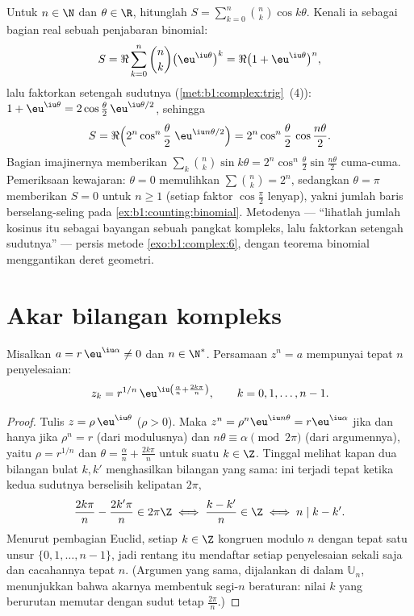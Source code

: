 \begin{example}\label{ex:b1:complex:binomsum}
Untuk $n \in \N$ dan $\theta \in \R$, hitunglah $S =
\sum_{k=0}^{n}\binom nk \cos k\theta$. Kenali ia sebagai bagian real
sebuah penjabaran binomial:
\[
S = \Re\sum_{k=0}^n \binom nk \bigl(\eu^{\iu\theta}\bigr)^k
= \Re\bigl(1 + \eu^{\iu\theta}\bigr)^n ,
\]
lalu faktorkan setengah sudutnya (\cref{met:b1:complex:trig}~(4)): $1 +
\eu^{\iu\theta} = 2\cos\frac\theta2\,\eu^{\iu\theta/2}$, sehingga
\[
S = \Re\Bigl(2^n\cos^n\frac\theta2\;\eu^{\iu n\theta/2}\Bigr)
= 2^n \cos^n\frac\theta2\,\cos\frac{n\theta}2 .
\]
Bagian imajinernya memberikan $\sum_k\binom nk\sin k\theta =
2^n\cos^n\frac\theta2\sin\frac{n\theta}2$ cuma-cuma. Pemeriksaan kewajaran:
$\theta = 0$ memulihkan $\sum\binom nk = 2^n$, sedangkan $\theta = \pi$
memberikan $S = 0$ untuk $n \geq 1$ (setiap faktor $\cos\frac\pi2$
lenyap), yakni jumlah baris berselang-seling pada
\cref{ex:b1:counting:binomial}. Metodenya --- ``lihatlah jumlah kosinus
itu sebagai bayangan sebuah pangkat kompleks, lalu faktorkan setengah sudutnya''
--- persis metode \cref{exo:b1:complex:6}, dengan teorema
binomial menggantikan deret geometri.
\end{example}

\section{Akar bilangan kompleks}

\begin{theorem}[Akar ke-$n$]\label{thm:b1:complex:roots}
Misalkan $a = r\,\eu^{\iu\alpha} \neq 0$ dan $n \in \N^*$. Persamaan
$z^n = a$ mempunyai tepat $n$ penyelesaian:
\[
z_k = r^{1/n}\, \eu^{\iu\left(\frac{\alpha}{n} +
\frac{2k\pi}{n}\right)},
\qquad k = 0, 1, \dots, n - 1 .
\]
\end{theorem}

\begin{proof}
Tulis $z = \rho\,\eu^{\iu\theta}$ ($\rho > 0$). Maka $z^n =
\rho^n \eu^{\iu n\theta} = r \eu^{\iu\alpha}$ jika dan hanya jika $\rho^n
= r$ (dari modulusnya) dan $n\theta \equiv \alpha \pmod{2\pi}$ (dari argumennya),
yaitu $\rho = r^{1/n}$ dan $\theta = \frac{\alpha}{n} +
\frac{2k\pi}{n}$ untuk suatu $k \in \Z$. Tinggal melihat kapan dua
bilangan bulat $k, k'$ menghasilkan bilangan yang sama: ini terjadi tepat ketika
kedua sudutnya berselisih kelipatan $2\pi$,
\[
\frac{2k\pi}n - \frac{2k'\pi}n \in 2\pi\Z
\iff \frac{k - k'}n \in \Z
\iff n \mid k - k' .
\]
Menurut pembagian Euclid, setiap $k \in \Z$ kongruen modulo $n$ dengan
tepat satu unsur $\{0, 1, \dots, n-1\}$, jadi rentang itu mendaftar
setiap penyelesaian sekali saja dan cacahannya tepat $n$. (Argumen yang
sama, dijalankan di dalam $\mathbb U_n$, menunjukkan bahwa akarnya membentuk
segi-$n$ beraturan: nilai $k$ yang berurutan memutar dengan sudut tetap
$\frac{2\pi}n$.)
\end{proof}

